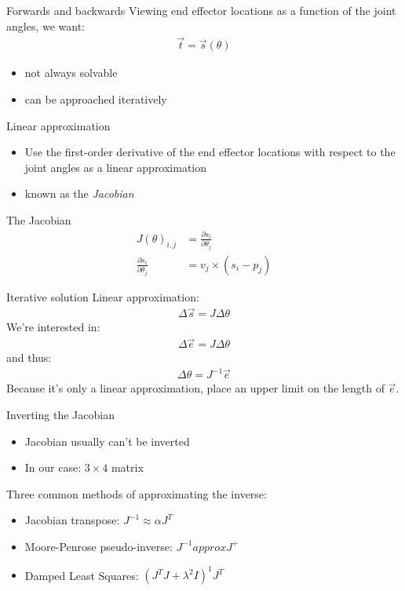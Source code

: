 \documentclass{beamer}
\begin{document}
\begin{frame}{Forwards and backwards}
  Viewing end effector locations as a function of the joint angles, we want:
  \begin{align*}
    \vec{t} = \vec{s}(\theta)
  \end{align*}

  \begin{itemize}
    \item not always solvable
    \item can be approached iteratively
  \end{itemize}
\end{frame}

\begin{frame}{Linear approximation}
  \begin{itemize}
  \item Use the first-order derivative of the end effector locations with
    respect to the joint angles as a linear approximation
  \item known as the \emph{Jacobian}
  \end{itemize}
  \begin{block}{The Jacobian}
    \begin{align*}
      J(\theta)_{i, j} &= \frac{\partial s_i}{\partial \theta_j} \\
      \frac{\partial s_i}{\partial \theta_j} &= v_j \times (s_i - p_j)
    \end{align*}
  \end{block}
\end{frame}

\begin{frame}{Iterative solution}
  Linear approximation:
  \begin{align*}
    \Delta \vec{s} = J \Delta\theta
  \end{align*}
  We're interested in:
  \begin{align*}
    \Delta \vec{e} = J \Delta\theta
  \end{align*}
  and thus:
  \begin{align*}
    \Delta \theta = J^{-1} \vec{e}
  \end{align*}
  \pause
  Because it's only a linear approximation, place an upper limit on the length
  of $\vec{e}$.
\end{frame}

\begin{frame}{Inverting the Jacobian}
  \begin{itemize}
    \item Jacobian usually can't be inverted
    \item In our case: $3\times4$ matrix
  \end{itemize}
  \pause
  Three common methods of approximating the inverse:
  \begin{itemize}
    \item Jacobian transpose: $J^{-1} \approx \alpha J^T$
    \item Moore-Penrose pseudo-inverse: $J^{-1} approx J^{+}$
    \item Damped Least Squares: $(J^T J  + \lambda^2 I)^1 J^T$
  \end{itemize}
\end{frame}
\end{document}
